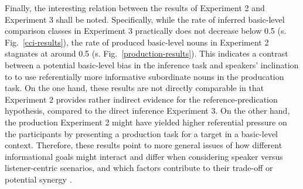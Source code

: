 Finally, the interesting relation between the results of Experiment 2 and Experiment 3 shall be noted. Specifically, while the rate of inferred basic-level comparison classes in Experiment 3 practically does not decrease below 0.5 (s. Fig.~\ref{cci-results}), the rate of produced basic-level nouns in Experiment 2 stagnates at around 0.5 (s. Fig.~\ref{production-results}). This indicates a contrast between a potential basic-level bias in the inference task and speakers' inclination to to use referentially more informative subordinate nouns in the producation task. On the one hand, these results are not directly comparable in that Experiment 2 provides rather indirect evidence for the reference-predication hypothesis, compared to the direct inference Experiment 3. On the other hand, the production Experiment 2 might have yielded higher referential pressure on the participants by presenting a production task for a target in a basic-level context. Therefore, these results point to more general issues of how different informational goals might interact and differ when considering speaker versus listener-centric scenarios, and which factors contribute to their trade-off or potential synergy \parencite[cf.][]{heller2008role}.  
